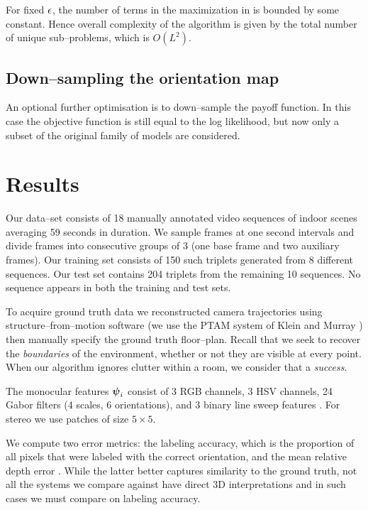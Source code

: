 For fixed $\RoundoffEps$, the number of terms in the maximization in
 is bounded by some constant. Hence
overall complexity of the algorithm is given by the total number of
unique sub--problems, which is $O(L^2)$.

\subsection{Down--sampling the orientation map}
An optional further optimisation is to down--sample the payoff
function. In this case the objective function is still equal to the
log likelihood, but now only a subset of the original family of models
are considered.

\section{Results}
\label{sect:results}
Our data--set consists of 18 manually annotated video sequences of
indoor scenes averaging 59 seconds in duration. We sample frames at
one second intervals and divide frames into consecutive groups of 3
(one base frame and two auxiliary frames). Our training set consists of
150 such triplets generated from 8 different sequences. Our test set
contains 204 triplets from the remaining 10 sequences. No sequence
appears in both the training and test sets.

To acquire ground truth data we reconstructed camera trajectories
using structure--from--motion software (we use the PTAM system of
Klein and Murray \cite{Klein07}) then manually specify the ground
truth floor--plan. Recall that we seek to recover the
\textit{boundaries} of the environment, whether or not they are
visible at every point. When our algorithm ignores clutter within a
room, we consider that a \textit{success}.

The monocular features $\Feature_i$ consist of 3 RGB channels, 3 HSV
channels, 24 Gabor filters (4 scales, 6 orientations), and 3 binary
line sweep features \cite{Lee09}. For stereo we use patches of size
$5 \times 5$.

We compute two error metrics: the labeling accuracy, which is the
proportion of all pixels that were labeled with the correct
orientation, and the mean relative depth error . While
the latter better captures similarity to the ground truth, not all the
systems we compare against have direct 3D interpretations and in such
cases we must compare on labeling accuracy.

